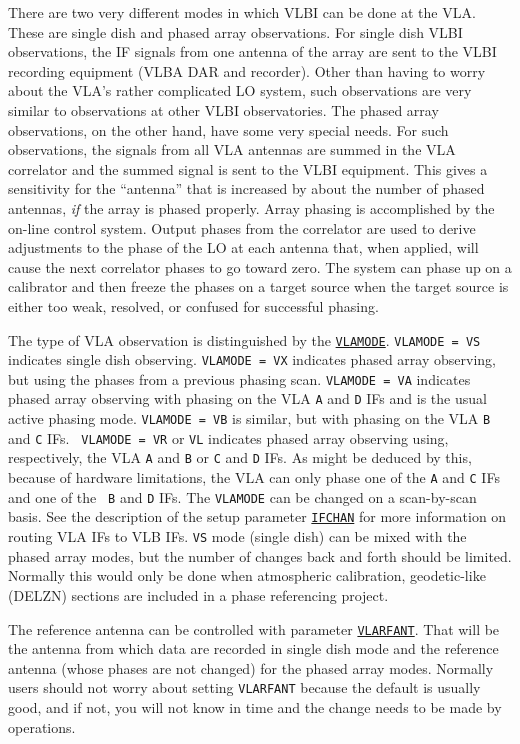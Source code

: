 \documentclass{report}
\begin{document}
There are two very different modes in which VLBI can be done at the
VLA.  These are single dish and phased array observations.  For single
dish VLBI observations, the IF signals from one antenna of the array
are sent to the VLBI recording equipment (VLBA DAR and recorder).
Other than having to worry about the VLA's rather complicated LO
system, such observations are very similar to observations at other
VLBI observatories.  The phased array observations, on the other hand,
have some very special needs.  For such observations, the signals from
all VLA antennas are summed in the VLA correlator and the summed
signal is sent to the VLBI equipment.  This gives a sensitivity for
the ``antenna'' that is increased by about the number of phased
antennas, {\em if} the array is phased properly.  Array phasing is
accomplished by the on-line control system.  Output phases from the
correlator are used to derive adjustments to the phase of the LO at
each antenna that, when applied, will cause the next correlator phases
to go toward zero.  The system can phase up on a calibrator and then
freeze the phases on a target source when the target source is either
too weak, resolved, or confused for successful phasing.

The type of VLA observation is distinguished by the 
{\hyperref[MP:VLAMODE]{{\tt VLAMODE}}}.
{\tt VLAMODE = VS} indicates single dish
observing.  {\tt VLAMODE = VX} indicates phased array observing, but
using the phases from a previous phasing scan.  {\tt VLAMODE = VA}
indicates phased array observing with phasing on the VLA {\tt A} and
{\tt D} IFs and is the usual active phasing mode.  {\tt VLAMODE = VB}
is similar, but with phasing on the VLA {\tt B} and {\tt C} IFs.  {\tt
VLAMODE = VR} or {\tt VL} indicates phased array observing using,
respectively, the VLA {\tt A} and {\tt B} or {\tt C} and {\tt D} IFs.
As might be deduced by this, because of hardware limitations, the VLA
can only phase one of the {\tt A} and {\tt C} IFs and one of the {\tt
B} and {\tt D} IFs.  The {\tt VLAMODE} can be changed on a
scan-by-scan basis.  See the description of the setup parameter
{\hyperref[SP:IFCHAN]{{\tt IFCHAN}}} for more information on routing VLA
IFs to VLB IFs.  {\tt VS} mode (single dish) can be mixed with the
phased array modes, but the number of changes back and forth should be
limited.  Normally this would only be done when atmospheric
calibration, geodetic-like (DELZN) sections are included in a phase
referencing project.

The reference antenna can be controlled with parameter 
{\hyperref[MP:VLARFANT]{{\tt VLARFANT}}}.
That will be the antenna from which data are
recorded in single dish mode and the reference antenna (whose phases
are not changed) for the phased array modes.  Normally users should not
worry about setting {\tt VLARFANT} because the default is usually
good, and if not, you will not know in time and the change needs to be
made by operations.
\end{document}
